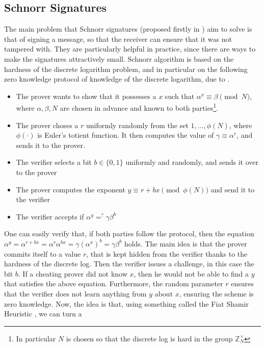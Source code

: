 \documentclass{article}
\begin{document}
\subsection{Schnorr Signatures}
The main problem that Schnorr signatures (proposed firstly in \cite{schnorrEfficientSignatureGeneration1991}) aim to 
solve is that of signing a message, so that the receiver can ensure that it was not tampered with. They are particularly
helpful in practice, since there are ways to make the signatures attractively small. Schnorr algorithm is based on the hardness
of the discrete logarithm problem, and in particular on the following zero knowledge protocol of knowledge of the 
discrete logarithm, due to \cite{chaumImprovedProtocolDemonstrating1988}.
\begin{itemize}
    \item The prover wants to show that it possesses a $x$ such that $\alpha^x \equiv \beta \pmod N$, where $\alpha, \beta, N$
          are chosen in advance and known to both parties\footnote{In particular $N$ is chosen so that the discrete log is hard in the group $\mathbb{Z}_N^\times$}.
    \item The prover choses a $r$ uniformly randomly from the set $1, \dots, \phi(N)$, where $\phi(\cdot)$ is Euler's
          totient function. It then computes the value of $\gamma \equiv \alpha^r$, and sends it to the prover.
    \item The verifier selects a bit $b \in \{0,1\}$ uniformly and randomly, and sends it over to the prover
    \item The prover computes the exponent $y \equiv r + bx \pmod{\phi(N)}$ and send it to the verifier
    \item The verifier accepts if $\alpha^y =^? \gamma \beta^b $
\end{itemize}
One can easily verify that, if both parties follow the protocol, then the equation 
$\alpha^y = \alpha^{r + bx} = \alpha^r \alpha^{bx} = \gamma (\alpha^x)^b = \gamma \beta^b$ holds. 
The main idea is that the prover commits itself to a value $r$, that is kept hidden from the verifier thanks to 
the hardness of the discrete log. Then the verifier issues a challenge, in this case the bit $b$. If a cheating prover
did not know $x$, then he would not be able to find a $y$ that satisfies the above equation. Furthermore, the random 
parameter $r$ ensures that the verifier does not learn anything from $y$ about $x$, ensuring the scheme is zero knowledge.
Now, the idea is that, using something called the Fiat Shamir Heuristic \cite{fiatHowProveYourself1987}, we can turn a 
\end{document}
